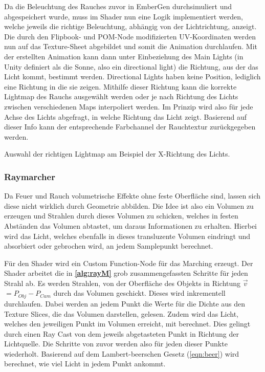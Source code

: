 Da die Beleuchtung des Rauches zuvor in EmberGen durchsimuliert und abgespeichert wurde, muss im Shader nun eine Logik implementiert werden, welche jeweils die richtige Beleuchtung,
abhängig von der Lichtrichtung, anzeigt. Die durch den Flipbook- und POM-Node modifizierten UV-Koordinaten werden nun auf das Texture-Sheet abgebildet und somit die Animation durchlaufen.
Mit der erstellten Animation kann dann unter Einbeziehung des Main Lights (in Unity definiert als die Sonne, also ein directional light) die Richtung, aus der
das Licht kommt, bestimmt werden. Directional Lights haben keine Position, lediglich eine Richtung in die sie zeigen. Mithilfe dieser Richtung kann die korrekte Lightmap
des Rauchs ausgewählt werden oder je nach Richtung des Lichts zwischen verschiedenen Maps interpoliert werden. Im Prinzip wird also für jede Achse des Lichts abgefragt,
in welche Richtung das Licht zeigt. Basierend auf dieser Info kann der entsprechende Farbchannel der Rauchtextur zurückgegeben werden.


\begin{algorithm}
	\caption{Auswahl der richtigen Lightmap am Beispiel der X-Richtung des Lichts.}
	\label{alg:lightMapLogik}
	\begin{algorithmic}[1]

		\Else
		\EndIf
	\end{algorithmic}
\end{algorithm}

\subsubsection{Raymarcher}

Da Feuer und Rauch volumetrische Effekte ohne feste Oberfläche sind, lassen sich diese nicht wirklich durch Geometrie abbilden. Die Idee ist also ein
Volumen zu erzeugen und Strahlen durch dieses Volumen zu schicken, welches in festen Abständen das Volumen abtastet, um daraus Informationen zu erhalten.
Hierbei wird das Licht, welches ebenfalls in dieses transluzente Volumen eindringt und absorbiert oder gebrochen wird, an jedem Samplepunkt berechnet.

Für den Shader wird ein Custom Function-Node für das Marching erzeugt. Der Shader arbeitet die in \textbf{\autoref{alg:rayM}} grob zusammengefassten
Schritte für jeden Strahl ab.
Es werden Strahlen, von der Oberfläche des Objekts in Richtung $\vec{v}$ $= P_{Obj} - P_{Cam}$ durch das Volumen geschickt.
Dieses wird inkrementell durchlaufen. Dabei werden an jedem Punkt die Werte für die Dichte aus den Texture Slices, die das Volumen darstellen, gelesen. 
Zudem wird das Licht, welches den jeweiligen Punkt im Volumen erreicht, mit berechnet. Dies gelingt durch einen Ray Cast von
dem jeweils abgetasteten Punkt in Richtung der Lichtquelle. Die Schritte von zuvor werden also für jeden dieser Punkte wiederholt.
Basierend auf dem Lambert-beerschen Gesetz (\autoref{eqn:beer}) wird berechnet, wie viel Licht in jedem Punkt ankommt.



